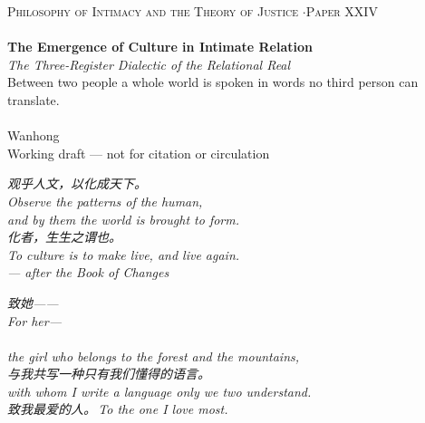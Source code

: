 \documentclass[11pt,a4paper]{article}
\begin{document}
\thispagestyle{empty}
\begin{center}
\vspace*{2cm}
{\footnotesize\color{rosedeep}\scshape Philosophy of Intimacy and the Theory of Justice \quad$\cdot$\quad Paper XXIV}\\[0.3cm]
\coverrule\\[1.2cm]
{\LARGE\bfseries\color{warnred} The Emergence of Culture in Intimate Relation}\\[0.7cm]
{\large\itshape\color{warnred} The Three-Register Dialectic of the Relational Real}\\[0.8cm]
{\normalsize\color{inksoft} Between two people a whole world is spoken in words no third person can translate.}\\[2cm]
\coverrule[0.25]\\[0.6cm]
{\normalsize\color{inksoft} Wanhong}\\
\vfill
{\footnotesize\color{gold} Working draft --- not for citation or circulation}
\coverfootnote
\end{center}
\newpage

\thispagestyle{empty}
\vspace*{2.2cm}
\begin{center}
\begin{minipage}{0.76\linewidth}
\centering\itshape\color{rose}
{\cjk 观乎人文，以化成天下。}\\[0.3em]
Observe the patterns of the human,\\[0.15em]
and by them the world is brought to form.\\[1.4em]
\upshape\itshape
{\cjk 化者，生生之谓也。}\\[0.3em]
To culture is to make live, and live again.\\[0.6em]
{\upshape\footnotesize\color{gold} --- after the \emph{Book of Changes}}
\end{minipage}
\end{center}
\newpage

\thispagestyle{empty}
\vspace*{4.5cm}
\begin{center}
\begin{minipage}{0.74\linewidth}
\centering\itshape\color{rose}
{\cjk 致她——}\\[0.3em]
For her---\\[0.7em]
\\[0.2em]
the girl who belongs to the forest and the mountains,\\[0.5em]
{\cjk 与我共写一种只有我们懂得的语言。}\\[0.2em]
with whom I write a language only we two understand.\\[1.0em]
{\upshape\footnotesize\color{gold} {\cjk 致我最爱的人。}\,\;To the one I love most.}
\end{minipage}
\end{center}
\newpage
\end{document}
